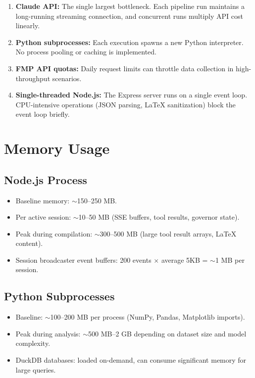 \begin{enumerate}
  \item \textbf{Claude API:} The single largest bottleneck. Each pipeline run maintains a long-running streaming connection, and concurrent runs multiply API cost linearly.
  \item \textbf{Python subprocesses:} Each execution spawns a new Python interpreter. No process pooling or caching is implemented.
  \item \textbf{FMP API quotas:} Daily request limits can throttle data collection in high-throughput scenarios.
  \item \textbf{Single-threaded Node.js:} The Express server runs on a single event loop. CPU-intensive operations (JSON parsing, \LaTeX{} sanitization) block the event loop briefly.
\end{enumerate}

\section{Memory Usage}
\label{sec:perf:memory}

\subsection{Node.js Process}

\begin{itemize}
  \item Baseline memory: $\sim$150--250 MB.
  \item Per active session: $\sim$10--50 MB (SSE buffers, tool results, governor state).
  \item Peak during compilation: $\sim$300--500 MB (large tool result arrays, LaTeX content).
  \item Session broadcaster event buffers: 200 events $\times$ average 5KB = $\sim$1 MB per session.
\end{itemize}

\subsection{Python Subprocesses}

\begin{itemize}
  \item Baseline: $\sim$100--200 MB per process (NumPy, Pandas, Matplotlib imports).
  \item Peak during analysis: $\sim$500 MB--2 GB depending on dataset size and model complexity.
  \item DuckDB databases: loaded on-demand, can consume significant memory for large queries.
\end{itemize}

